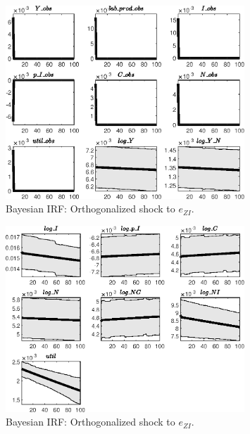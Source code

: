 \begin{figure}[H]
\centering 
\includegraphics[width=0.80\textwidth]{BRS_imp_mobility/Output/BRS_imp_mobility_Bayesian_IRF_e_ZI_1}
\caption{Bayesian IRF: Orthogonalized shock to ${e_{ZI}}$.}
\label{Fig:BayesianIRF:e_ZI:1}
\end{figure}
 
\begin{figure}[H]
\centering 
\includegraphics[width=0.80\textwidth]{BRS_imp_mobility/Output/BRS_imp_mobility_Bayesian_IRF_e_ZI_2}
\caption{Bayesian IRF: Orthogonalized shock to ${e_{ZI}}$.}
\label{Fig:BayesianIRF:e_ZI:2}
\end{figure}
 
